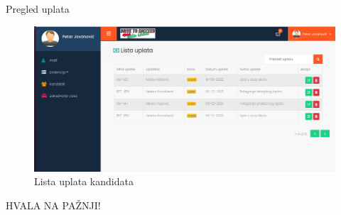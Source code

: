\documentclass[compress, containsverbatim,mathserif, xcolor=dvipsnames, unicode]{beamer}
\begin{document}
\begin{frame}{Pregled uplata}
        \begin{figure}[h!]
        \begin{center}
          \includegraphics[scale = 0.25]{UI_lista_uplata.png}
        \end{center}
       \caption{Lista uplata kandidata }
    \end{figure}   
\end{frame}


\begin{frame}{}
        \begin{center}
        \Huge HVALA NA PAŽNJI!
        \end{center}



\end{frame}
\end{document}
